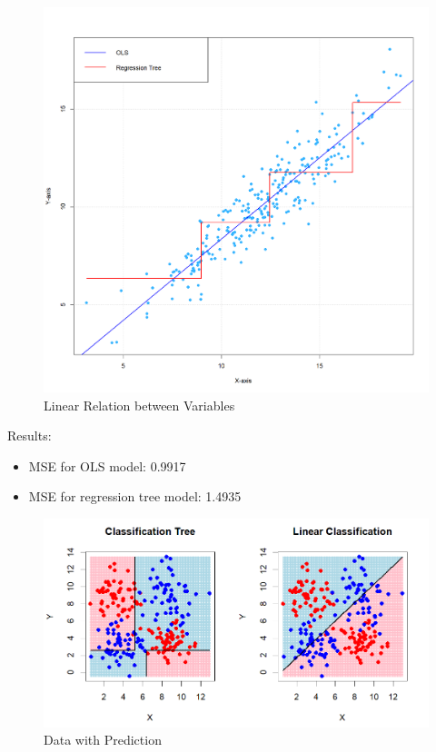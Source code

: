 \documentclass[12pt]{article}
\begin{document}
\begin{figure}
    \centering
    \includegraphics[scale=0.50]{OLS vs Tree.png}
    \caption{Linear Relation between Variables}
    \label{fig:sub1}  %
\end{figure}


Results:
\begin{itemize}
    \item MSE for OLS model: 0.9917 
    \item MSE for regression tree model: 1.4935 
\end{itemize}




\begin{figure}
    \centering
    \includegraphics[scale=0.50]{NLD Pred.png}
    \caption{Data with Prediction}
    \label{fig:sub2}  %
\end{figure}
\end{document}
